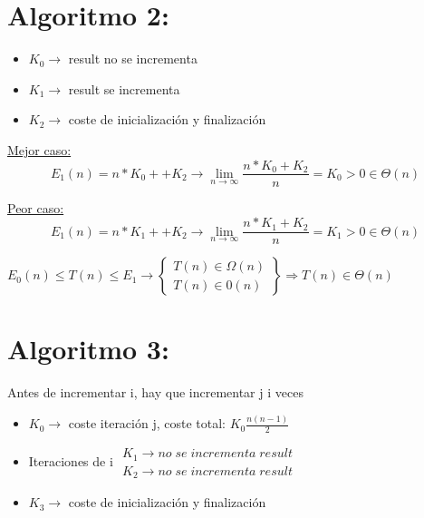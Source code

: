 \documentclass{article}
\begin{document}
\section*{Algoritmo 2:}
\begin{figure}[H]
    \centering
    
\end{figure}

\begin{itemize}
    \item $K_0 \rightarrow$ result no se incrementa
    \item $K_{1} \rightarrow$ result se incrementa
    \item $K_{2} \rightarrow$ coste de inicialización y finalización
\end{itemize}

\underline{Mejor caso:}
\[
    E_{1}(n) = n*K_{0} + + K_{2} \rightarrow \lim_{n \rightarrow \infty} \frac{n*K_{0} + K_{2}}{n} = K_{0} > 0 \in \Theta (n)
\]

\underline{Peor caso: }
\[
    E_{1}(n) = n*K_{1} + + K_{2} \rightarrow \lim_{n \rightarrow \infty} \frac{n*K_{1} + K_{2}}{n} = K_{1} > 0 \in \Theta (n)
\]

$E_{0}(n) \leq T(n) \leq E_{1} \rightarrow \left\{\begin{array}{l}
        T(n) \in \Omega(n) \\
        T(n) \in 0(n)
    \end{array}\right\} \Rightarrow T(n) \in \Theta (n)$


\section*{Algoritmo 3:}
\begin{figure}[H]
    \centering
    
\end{figure}

Antes de incrementar i, hay que incrementar j i veces
\begin{itemize}
    \item $K_{0} \rightarrow$ coste iteración j, coste total: $K_{0}\frac{n(n-1)}{2}$
    \item Iteraciones de i $\begin{array}{l}
                  K_{1} \rightarrow no\; se\; incrementa\; result \\
                  K_{2} \rightarrow no\; se\; incrementa\; result
              \end{array}$
    \item $K_{3} \rightarrow$ coste de inicialización y finalización
\end{itemize}
\end{document}
